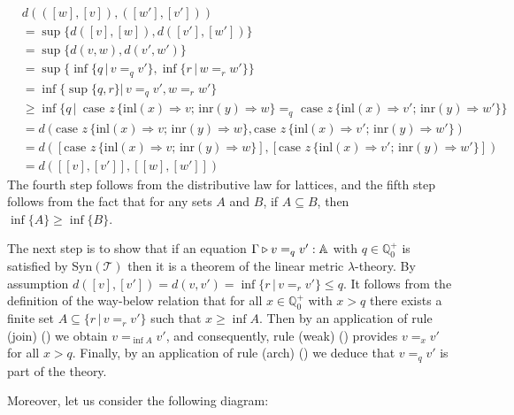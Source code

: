 \documentclass[a4paper,UKenglish,cleveref, autoref, thm-restate]{lipics-v2021}
\begin{document}
  \begin{align*}
    & d(([w], [v]), ([w'], [v']))  \\
    & = \sup{\{d([v],[w]),d([v'],[w']) \}}  \\
    & = \sup{\{d(v,w),d(v',w') \}} \\
    & = \sup {\{ \inf{\{q \, \vert \, v=_q v'\}},\inf{\{r \, \vert \, w=_r w'\}}  \}} \\
    & = \inf{\{ \sup \{ q, r \} \vert \, v=_q v', w=_r w' \}} &  \\
    & \geq  \inf{ \{ q  \,\vert \, \text{ case } z \,   \{\text{inl} (x) \Rightarrow v ; \, \text{inr} (y) \Rightarrow w\} =_{q} \text{ case } z \,  \{\text{inl} (x) \Rightarrow v' ; \,\text{inr} (y) \Rightarrow w'\} \} } &  \\ 
    & = d(\text{case } z \,   \{\text{inl} (x) \Rightarrow v ; \, \text{inr} (y) \Rightarrow w\}, \text{case } z \,  \{\text{inl} (x) \Rightarrow v' ; \,\text{inr} (y) \Rightarrow w'\}) \\
    & = d([\text{case } z \,   \{\text{inl} (x) \Rightarrow v ; \, \text{inr} (y) \Rightarrow w\}], [\text{case } z \,  \{\text{inl} (x) \Rightarrow v' ; \,\text{inr} (y) \Rightarrow w'\}]) \\
    & = d([[v],[v']],[[w],[w']])  
  \end{align*}
   The fourth step follows from the distributive law for lattices, and the fifth step follows from the fact that for any sets $A$ and $B$, if $A \subseteq B$, then $\inf\{A\} \geq \inf\{B\}$.

  The next step is to show that if an equation $\Gamma \triangleright v =_q v' : \mathbb{A}$ with $q \in \mathbb{Q}^{+}_0$ is satisfied by Syn$(\mathscr{T})$ then it is a theorem of the linear metric $\lambda$-theory. By assumption $d([v],[v']) = d(v,v') =  \inf{ \{r \, \vert \, v =_r v'\}} \leq q$. It follows from the definition of the way-below relation that for all
 $x \in \mathbb{Q}^{+}_0$ with $x>q$ there exists a finite set $A \subseteq \{r \, \vert \, v =_r v'\}$ such that $x \geq \inf{A}$. Then by an
 application of rule (join) (\cite[Figure 4]{dahlqvist2023syntactic}) we obtain $v =_{\inf{A}} v'$, and consequently, rule (weak) (\cite[Figure 4]{dahlqvist2023syntactic}) provides $v =_x v'$ for all $x > q$. Finally, by an application of rule (arch) (\cite[Figure 4]{dahlqvist2023syntactic}) we deduce that $v =_q v'$ is part of the theory.

  Moreover, let us consider the following diagram:

  \vspace{10pt}
\end{document}
